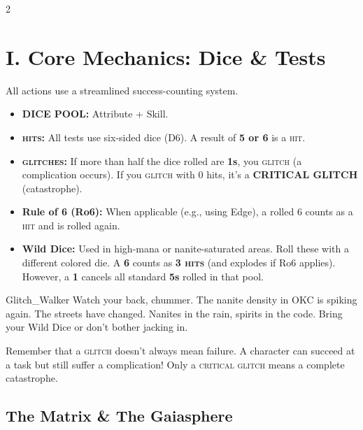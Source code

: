 \documentclass[10pt, letterpaper]{article}
\begin{document}
\begin{multicols}{2}

\section*{I. Core Mechanics: Dice \& Tests}

All actions use a streamlined success-counting system.

\begin{itemize}
\setlength{\itemsep}{0pt}\setlength{\parskip}{0pt}
\item
  \textbf{DICE POOL:} Attribute + Skill.
\item
  \textbf{\textsc{hits}:} All tests use six-sided dice (D6). A result of
  \textbf{5 or 6} is a \textsc{hit}.
\item
  \textbf{\textsc{glitches}:} If more than half the dice rolled are \textbf{1s},
  you \textsc{glitch} (a complication occurs). If you \textsc{glitch} with 0 hits, it's a
  \textbf{\color{sraccent}CRITICAL GLITCH} (catastrophe).
\item
  \textbf{Rule of 6 (Ro6):} When applicable (e.g., using Edge), a rolled
  6 counts as a \textsc{hit} and is rolled again.
\item
  \textbf{Wild Dice:} Used in high-mana or nanite-saturated areas. Roll
  these with a different colored die. A \textbf{6} counts as \textbf{3
  \textsc{hits}} (and explodes if Ro6 applies). However, a \textbf{1} cancels all
  standard \textbf{5s} rolled in that pool.
\end{itemize}

\begin{jackpoint}{Glitch\_Walker}
Watch your back, chummer. The nanite density in OKC is spiking again. The streets have changed. Nanites in the rain, spirits in the code. Bring your Wild Dice or don't bother jacking in.
\end{jackpoint}

\begin{gmadvice}
Remember that a \textsc{glitch} doesn't always mean failure. A character can succeed at a task but still suffer a complication! Only a \textsc{critical glitch} means a complete catastrophe.
\end{gmadvice}

\subsection*{The Matrix \& The Gaiasphere}


\end{multicols}
\end{document}
